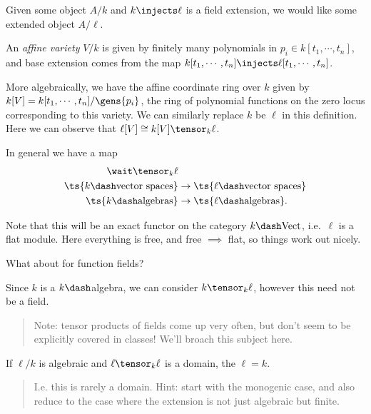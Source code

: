 Given some object \(A/k\) and \(k\injects \ell\) is a field extension,
we would like some extended object \(A/\ell\).

\begin{example}

An \emph{affine variety} \(V/k\) is given by finitely many polynomials
in \(p_i \in k[t_1, \cdots, t_n]\), and base extension comes from the
map \(k[t_1, \cdots, t_n] \injects \ell[t_1, \cdots, t_n]\).

More algebraically, we have the affine coordinate ring over \(k\) given
by \(k[V] = k[t_1,\cdots, t_n]/\gens{p_i}\), the ring of polynomial
functions on the zero locus corresponding to this variety. We can
similarly replace \(k\) be \(\ell\) in this definition. Here we can
observe that \(\ell[V] \cong k[V] \tensor_k \ell\).

\end{example}

In general we have a map
\begin{align*}  
\wait \tensor_k \ell & \\
\ts{k\dash\text{vector spaces}} &\to \ts{\ell\dash\text{vector spaces}} \\
\ts{k\dash\text{algebras}} &\to\ts{\ell\dash\text{algebras}}
.\end{align*}

Note that this will be an exact functor on the category
\(k\dash\text{Vect}\), i.e.~\(\ell\) is a flat module. Here everything
is free, and free \(\implies\) flat, so things work out nicely.

What about for function fields?

Since \(k\) is a \(k\dash\)algebra, we can consider \(k\tensor_k \ell\),
however this need not be a field.

\begin{quote}
Note: tensor products of fields come up very often, but don't seem to be
explicitly covered in classes! We'll broach this subject here.
\end{quote}

\begin{exercise}

If \(\ell/k\) is algebraic and \(\ell\tensor_k \ell\) is a domain, the
\(\ell = k\).

\begin{quote}
I.e. this is rarely a domain. Hint: start with the monogenic case, and
also reduce to the case where the extension is not just algebraic but
finite.
\end{quote}

\end{exercise}

